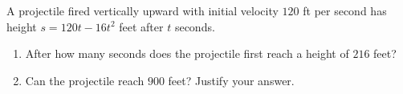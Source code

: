 A projectile fired vertically upward with initial velocity $120$ ft per second has height $s=120t-16t^2$ feet after $t$ seconds.
\begin{enumerate}
\item[(a)] After how many seconds does the projectile first reach a height of $216$ feet?
\item[(b)] Can the projectile reach $900$ feet? Justify your answer.
\end{enumerate}
